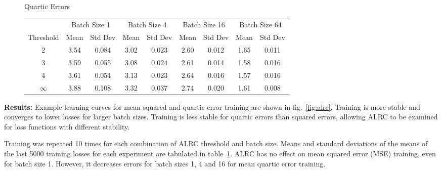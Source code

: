 \documentclass[letterpaper, 10 pt, conference]{ieeeconf}  %
\newcommand\extraspace{3pt}
\begin{document}
\begin{figure}[tbh!]
Quartic Errors\\
\begin{tabular*}{\textwidth}{@{\extracolsep{\fill}}c|cccccccc}
\hline
\multicolumn{1}{c|}{}       & \multicolumn{2}{c}{Batch Size 1} & \multicolumn{2}{c}{Batch Size 4} & \multicolumn{2}{c}{Batch Size 16} & \multicolumn{2}{c}{Batch Size 64} \\
Threshold & Mean         & \multicolumn{1}{c}{Std Dev}      & Mean       & Std Dev      & Mean       & \multicolumn{1}{c}{Std Dev}       & Mean      & Std Dev      \\ \hline
2 & 3.54 & 0.084 & 3.02 & 0.023 & 2.60 & 0.012 & 1.65 & 0.011 \\
3 & 3.59 & 0.055 & 3.08 & 0.024 & 2.61 & 0.014 & 1.58 & 0.016 \\
4 & 3.61 & 0.054 & 3.13 & 0.023 & 2.64 & 0.016 & 1.57 & 0.016 \\
$\infty$ & 3.88 & 0.108 & 3.32 & 0.037 & 2.74 & 0.020 & 1.61 & 0.008 \\
\hline
\end{tabular*}
\label{table:alrc}
\end{figure}

\vspace{\extraspace}
\noindent\textbf{Results:} Example learning curves for mean squared and quartic error training are shown in fig.~\ref{fig:alrc}. Training is more stable and converges to lower losses for larger batch sizes. Training is less stable for quartic errors than squared errors, allowing ALRC to be examined for loss functions with different stability.

Training was repeated 10 times for each combination of ALRC threshold and batch size. Means and standard deviations of the means of the last 5000 training losses for each experiment are tabulated in table~\ref{table:alrc}. ALRC has no effect on mean squared error (MSE) training, even for batch size 1. However, it decreases errors for batch sizes 1, 4 and 16 for mean quartic error training.
\end{document}
